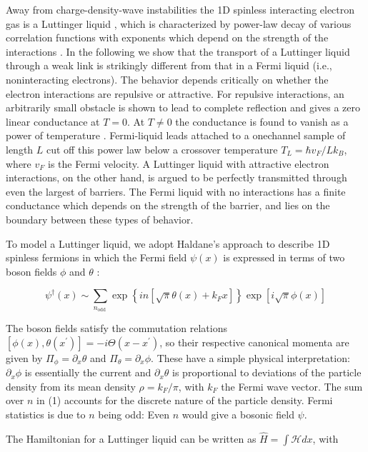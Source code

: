 \documentclass[11pt]{article}
\begin{document}
Away from charge-density-wave instabilities the 1D spinless interacting electron gas is a Luttinger liquid \cite{ref8}, which is characterized by power-law decay of various correlation functions with exponents which depend on the strength of the interactions \cite{ref8,ref9}. In the following we show that the transport of a Luttinger liquid through a weak link is strikingly different from that in a Fermi liquid (i.e., noninteracting electrons). The behavior depends critically on whether the electron interactions are repulsive or attractive. For repulsive interactions, an arbitrarily small obstacle is shown to lead to complete reflection and gives a zero linear conductance at $T=0$. At $T \neq 0$ the conductance is found to vanish as a power of temperature \cite{ref10}. Fermi-liquid leads attached to a onechannel sample of length $L$ cut off this power law below a crossover temperature $T_{L}=\hbar v_{F} / L k_{B}$, where $v_{F}$ is the Fermi velocity. A Luttinger liquid with attractive electron interactions, on the other hand, is argued to be perfectly transmitted through even the largest of barriers. The Fermi liquid with no interactions has a finite conductance \cite{ref6} which depends on the strength of the barrier, and lies on the boundary between these types of behavior.

To model a Luttinger liquid, we adopt Haldane's approach \cite{ref11} to describe 1D spinless fermions in which the Fermi field $\psi(x)$ is expressed in terms of two boson fields $\phi$ and $\theta$ :

\begin{equation}
\psi^{\dagger}(x) \sim \sum_{n_{\text {odd }}} \exp \left\{i n\left[\sqrt{\pi} \theta(x)+k_{F} x\right]\right\} \exp [i \sqrt{\pi} \phi(x)] 
\end{equation}

The boson fields satisfy the commutation relations $\left[\phi(x), \theta\left(x^{\prime}\right)\right]=-i \Theta\left(x-x^{\prime}\right)$, so their respective canonical momenta are given by $\Pi_{\phi}=\partial_{x} \theta$ and $\Pi_{\theta}=\partial_{x} \phi$. These have a simple physical interpretation: $\partial_{x} \phi$ is essentially the current and $\partial_{x} \theta$ is proportional to deviations of the particle density from its mean density $\rho=k_{F} / \pi$, with $k_{F}$ the Fermi wave vector. The sum over $n$ in (1) accounts for the discrete nature of the particle density. Fermi statistics is due to $n$ being odd: Even $n$ would give a bosonic field $\psi$.

The Hamiltonian for a Luttinger liquid can be written as $\hat{H}=\int \mathcal{H} d x$, with
\end{document}
